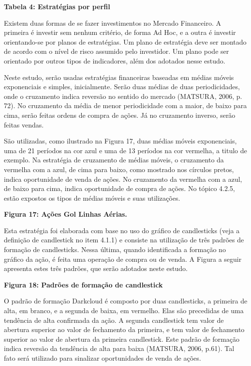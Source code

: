 \textbf{Tabela 4: Estratégias por perfil}


Existem duas formas de se fazer investimentos no Mercado Financeiro. A primeira é investir sem nenhum critério, de forma Ad Hoc, e a outra é investir orientando-se por planos de estratégias. Um plano de estratégia deve ser montado de acordo com o nível de risco assumido pelo investidor. Um plano pode ser orientado por outros tipos de indicadores, além dos adotados nesse estudo.

Neste estudo, serão usadas estratégias financeiras baseadas em médias móveis exponenciais e simples, inicialmente. Serão duas médias de duas periodicidades, onde o cruzamento indica reversão no sentido do mercado (MATSURA, 2006, p. 72). No cruzamento da média de menor periodicidade com a maior, de baixo para cima, serão feitas ordens de compra de ações. Já no cruzamento inverso, serão feitas vendas.


São utilizadas, como ilustrado na Figura 17, duas médias móveis exponenciais, uma de 21 períodos na cor azul e uma de 13 períodos na cor vermelha, a titulo de exemplo. Na estratégia de cruzamento de médias móveis, o cruzamento da vermelha com a azul, de cima para baixo, como mostrado nos círculos pretos, indica oportunidade de venda de ações. No cruzamento da vermelha com a azul, de baixo para cima, indica oportunidade de compra de ações. No tópico 4.2.5, estão expostos os tipos de médias móveis e suas utilizações.

\textbf{Figura 17: Ações Gol Linhas Aérias.}


Esta estratégia foi elaborada com base no uso do gráfico de candlesticks (veja a definição de candlestick no item 4.1.1) e consiste na utilização de três padrões de formação de candlesticks. Nessa última, quando identificada a formação no gráfico da ação, é feita uma operação de compra ou de venda. A Figura a seguir apresenta estes três padrões, que serão adotados neste estudo.

\textbf{Figura  18: Padrões de formação de candlestick}

O padrão de formação Darkcloud é composto por duas candlesticks, a primeira de alta, em branco, e a segunda de baixa, em vermelho. Elas são precedidas de uma tendência de alta confirmada da ação. A segunda candlestick tem valor de abertura superior ao valor de fechamento da primeira, e tem valor de fechamento superior ao valor de abertura da primeira candlestick. Este padrão de formação indica reversão da tendência de alta para baixa (MATSURA, 2006, p.61). Tal fato será utilizado para sinalizar oportunidades de venda de ações.


